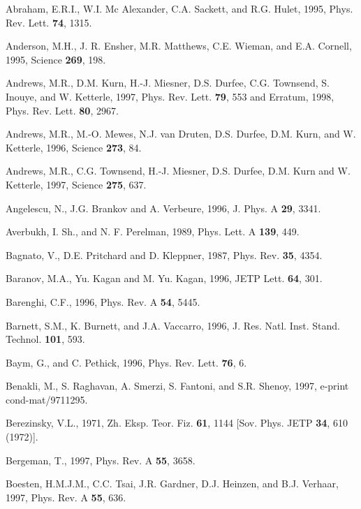 \newpage

\begin{references}

  Abraham, E.R.I., W.I. Mc Alexander, C.A. Sackett,
and R.G. Hulet, 1995, Phys. Rev. Lett. {\bf 74}, 1315.

 Anderson, M.H., J. R. Ensher, M.R. Matthews, C.E.  
Wieman, and E.A.  Cornell, 1995, Science {\bf 269}, 198.

 Andrews, M.R., D.M. Kurn, H.-J. Miesner,  D.S.
Durfee, C.G. Townsend, S. Inouye, and W. Ketterle, 1997, Phys. Rev. Lett.
{\bf 79}, 553 and Erratum, 1998, Phys. Rev. Lett. {\bf 80}, 2967. 

  Andrews, M.R., M.-O. Mewes, N.J. van Druten, D.S.
Durfee, D.M. Kurn, and W. Ketterle, 1996, Science {\bf 273}, 84. 

 Andrews, M.R., C.G. Townsend, H.-J. Miesner, D.S.
Durfee, D.M. Kurn and W. Ketterle, 1997, Science {\bf 275}, 637.

  Angelescu, N., J.G. Brankov and A. Verbeure, 1996,
J. Phys. A {\bf 29}, 3341.

 Averbukh, I. Sh., and N. F. Perelman, 1989, Phys.
Lett. A {\bf 139}, 449.

  Bagnato, V., D.E. Pritchard and D. Kleppner, 1987,
Phys. Rev. {\bf 35}, 4354.

   Baranov, M.A., Yu. Kagan and M. Yu. Kagan, 1996, 
JETP Lett. {\bf 64}, 301. 

 Barenghi, C.F., 1996, Phys. Rev. A {\bf 54}, 5445.

  Barnett, S.M., K. Burnett, and J.A. Vaccarro, 1996,
J. Res. Natl. Inst. Stand. Technol. {\bf 101}, 593.

     Baym, G., and C. Pethick, 1996, Phys. Rev. Lett.
{\bf 76}, 6.

  Benakli, M., S. Raghavan, A. Smerzi, S. Fantoni, and
S.R. Shenoy, 1997, e-print cond-mat/9711295. 

 Berezinsky, V.L., 1971, Zh. Eksp. Teor. Fiz. {\bf 61}, 
1144 [Sov. Phys. JETP {\bf 34}, 610 (1972)]. 

   Bergeman, T., 1997, Phys. Rev. A {\bf 55}, 3658.

  Boesten, H.M.J.M., C.C. Tsai, J.R. Gardner, D.J.
Heinzen, and B.J. Verhaar, 1997, Phys. Rev. A {\bf 55}, 636.


\end{references}
